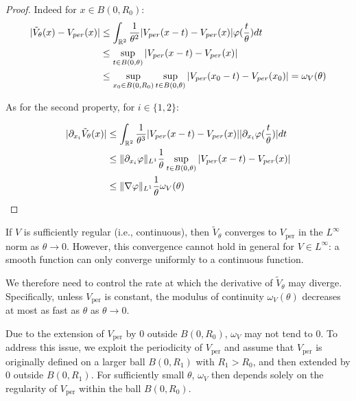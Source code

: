 \documentclass[leqno,11pt,letterpaper, english]{amsart}
\newcommand{\nn}{\nonumber}
\theoremstyle{plain}
\theoremstyle{definition}
\numberwithin{equation}{section}
\begin{document}
\begin{proof}

Indeed for $x\in B(0,R_0)$:
\begin{align}
    |\Tilde{V}_\theta(x)-V_{per}(x)| &\leq \int_{\mathbb{R}^2} \frac{1}{\theta^2} |V_{per}(x-t)-V_{per}(x)|\varphi(\frac{t}{\theta})dt\nn\\
    &\leq \sup_{t \in B(0,\theta)}|V_{per}(x-t)-V_{per}(x)| \nn\\
    &\leq \sup_{x_0\in B(0,R_0)} \sup_{t \in B(0,\theta)}|V_{per}(x_0-t)-V_{per}(x_0)| = \omega_V(\theta)
\end{align}

As for the second property, for $i\in\{1,2\}$:

\begin{align}
    |\partial_{x_i}\Tilde{V}_\theta(x)| &\leq \int_{\mathbb{R}^2} \frac{1}{\theta^{3}} |V_{per}(x-t)-V_{per}(x)||\partial_{x_i}\varphi(\frac{t}{\theta})|dt \nn\\
    &\leq \lVert \partial_{x_i}\varphi\rVert_{L^1} \frac{1}{\theta}\sup_{t \in B(0,\theta)}|V_{per}(x-t)-V_{per}(x)| \nn\\
    &\leq \lVert \nabla \varphi \rVert_{L^1} \frac{1}{\theta}\omega_V(\theta)
\end{align}
\end{proof}


If \( V \) is sufficiently regular (i.e., continuous), then \( \tilde{V}_\theta \) converges to \( V_{\text{per}} \) in the \( L^\infty \) norm as \( \theta \to 0 \). However, this convergence cannot hold in general for \( V \in L^\infty \): a smooth function can only converge uniformly to a continuous function.

We therefore need to control the rate at which the derivative of \( \tilde{V}_\theta \) may diverge. Specifically, unless \( V_{\text{per}} \) is constant, the modulus of continuity \( \omega_V(\theta) \) decreases at most as fast as \( \theta \) as \( \theta \to 0 \).

Due to the extension of \( V_{\text{per}} \) by \( 0 \) outside \( B(0, R_0) \), \( \omega_V \) may not tend to \( 0 \). To address this issue, we exploit the periodicity of \( V_{\text{per}} \) and assume that \( V_{\text{per}} \) is originally defined on a larger ball \( B(0, R_1) \) with \( R_1 > R_0 \), and then extended by \( 0 \) outside \( B(0, R_1) \). For sufficiently small \( \theta \), \( \omega_V \) then depends solely on the regularity of \( V_{\text{per}} \) within the ball \( B(0, R_0) \).
\end{document}

